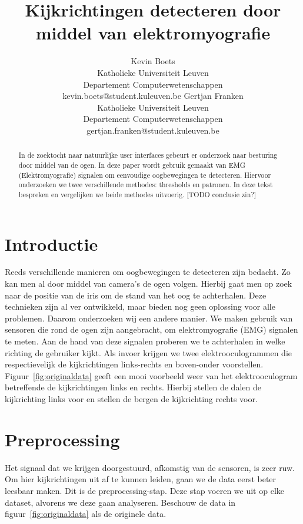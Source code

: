 \documentclass{article}
\title{Kijkrichtingen detecteren door middel van elektromyografie}
\author{Kevin Boets \\ Katholieke Universiteit Leuven\\ Departement Computerwetenschappen \\ kevin.boets@student.kuleuven.be
\And
Gertjan Franken \\ Katholieke Universiteit Leuven\\ Departement Computerwetenschappen \\ gertjan.franken@student.kuleuven.be}
\begin{document}
\maketitle

\begin{abstract}
In de zoektocht naar natuurlijke user interfaces gebeurt er onderzoek naar besturing door middel van de ogen. In deze paper wordt gebruik gemaakt van EMG (Elektromyografie) signalen om eenvoudige oogbewegingen te detecteren. Hiervoor onderzoeken we twee verschillende methodes: thresholds en patronen. In deze tekst bespreken en vergelijken we beide methodes uitvoerig. [TODO conclusie zin?]
\end{abstract}

\section{Introductie}

Reeds verschillende manieren om oogbewegingen te detecteren zijn bedacht. Zo kan men al door middel van camera's de ogen volgen. Hierbij gaat men op zoek naar de positie van de iris om de stand van het oog te achterhalen. Deze technieken zijn al ver ontwikkeld, maar bieden nog geen oplossing voor alle problemen. Daarom onderzoeken wij een andere manier. We maken gebruik van sensoren die rond de ogen zijn aangebracht, om elektromyografie (EMG) signalen te meten. Aan de hand van deze signalen proberen we te achterhalen in welke richting de gebruiker kijkt. Als invoer krijgen we twee elektrooculogrammen die respectievelijk de kijkrichtingen links-rechts en boven-onder voorstellen. Figuur~\ref{fig:originaldata} geeft een mooi voorbeeld weer van het elektrooculogram betreffende de kijkrichtingen links en rechts. Hierbij stellen de dalen de kijkrichting links voor en stellen de bergen de kijkrichting rechts voor.

\section{Preprocessing}

Het signaal dat we krijgen doorgestuurd, afkomstig van de sensoren, is zeer ruw. Om hier kijkrichtingen uit af te kunnen leiden, gaan we de data eerst beter leesbaar maken. Dit is de preprocessing-stap. Deze stap voeren we uit op elke dataset,  alvorens we deze gaan analyseren. Beschouw de data in figuur~\ref{fig:originaldata} als de originele data.
\end{document}
